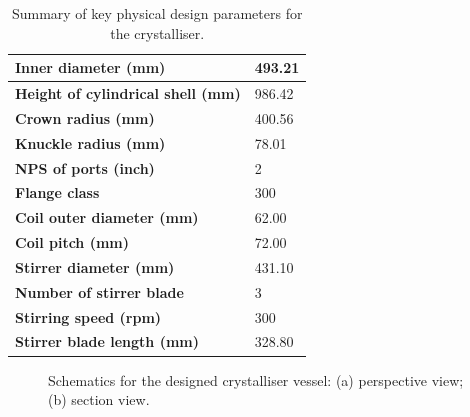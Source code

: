 \begin{table}[h]
\centering
\caption{Summary of key physical design parameters for the crystalliser.}
 \label{tab:crystalliser mech design summary}
\begin{tabular}{@{}l|l@{}}
\toprule
\textbf{Inner diameter (mm)}                &    493.21 \\ \midrule
\textbf{Height of cylindrical shell (mm)}   & 986.42 \\ \midrule
\textbf{Crown radius (mm)}                  & 400.56 \\ \midrule
\textbf{Knuckle radius (mm)}                & 78.01 \\ \midrule
\textbf{NPS of ports (inch)}                & 2 \\ \midrule
\textbf{Flange class}                       & 300 \\ \midrule
\textbf{Coil outer diameter (mm)}           & 62.00 \\ \midrule
\textbf{Coil pitch (mm)}                    & 72.00 \\ \midrule
\textbf{Stirrer diameter (mm)}              & 431.10 \\ \midrule
\textbf{Number of stirrer blade}            & 3 \\ \midrule
\textbf{Stirring speed (rpm)}               & 300 \\ \midrule
\textbf{Stirrer blade length (mm)}          & 328.80 \\ \bottomrule
\end{tabular}
\end{table}

\begin{figure}[h]
    \centering
    
    \caption{Schematics for the designed crystalliser vessel: (a) perspective view; (b) section view.}
    \label{fig:crystalliser schematic}
\end{figure}


